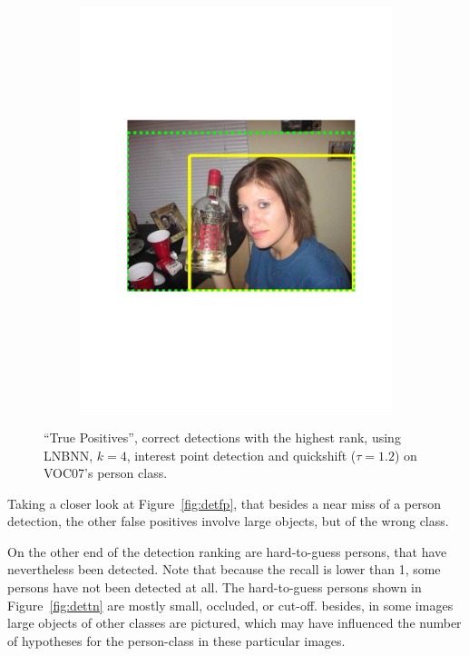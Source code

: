\begin{figure}[hbt]
\begin{subfigure}[b]{0.45\textwidth}
        \includegraphics[width=\textwidth]{TP63}
        \caption{}
        \label{fig:dettp4}
    \end{subfigure}
    \caption{``True Positives'', correct detections with the highest rank, using LNBNN, $k=4$, interest point detection and quickshift ($\tau=1.2$) on VOC07's person class.}
    \label{fig:dettp}
\end{figure}

Taking a closer look at Figure~\ref{fig:detfp}, that besides a near miss of a person detection, the other false positives involve large objects, but of the wrong class.

On the other end of the detection ranking are hard-to-guess persons, that have nevertheless been detected. Note that because the recall is lower than 1, some persons have not been detected at all. The hard-to-guess persons shown in Figure~\ref{fig:dettn} are mostly small, occluded, or cut-off. besides, in some images large objects of other classes are pictured, which may have influenced the number of hypotheses for the person-class in these particular images.

